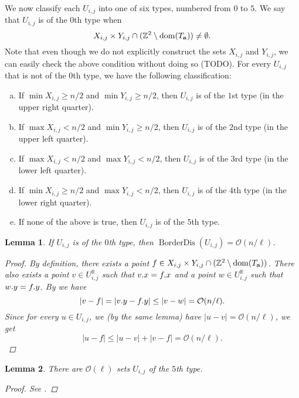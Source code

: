 \documentclass[11pt]{article}
\newcommand{\R}{\mathbb{R}}
\newcommand{\Z}{\mathbb{Z}}
\renewcommand{\O}{\mathcal{O}}
\theoremstyle{plain}
\newtheorem{lemma}{Lemma}
\theoremstyle{definition}
\theoremstyle{remark}
\DeclareMathOperator*{\BD}{BorderDis}
\begin{document}
We now classify each $U_{i, j}$ into one of six types, numbered from $0$ to $5$.
We say that $U_{i, j}$ is of the $0$th type when
$$ X_{i, j} \times Y_{i, j} \cap (\Z^2 \setminus \d{\Ta}) \neq \emptyset.$$
Note that even though we do not explicitly construct the sets $X_{i, j}$ and $Y_{i, j}$, we can easily check the above condition without doing so (TODO).
For every $U_{i, j}$ that is not of the $0$th type, we have the following classification:
\begin{enumerate}[a)]
	\item If $\min X_{i, j} \ge n / 2$ and $\min Y_{i, j} \ge n / 2$, then $U_{i, j}$ is of the $1$st type (in the upper right quarter).
	\item If $\max X_{i, j}  <  n / 2$ and $\min Y_{i, j} \ge n / 2$, then $U_{i, j}$ is of the $2$nd type (in the upper left quarter).
	\item If $\max X_{i, j}  <  n / 2$ and $\max Y_{i, j}  <  n / 2$, then $U_{i, j}$ is of the $3$rd type (in the lower left quarter).
	\item If $\min X_{i, j} \ge n / 2$ and $\max Y_{i, j}  <  n / 2$, then $U_{i, j}$ is of the $4$th type (in the lower right quarter).
	\item If none of the above is true, then $U_{i, j}$ is of the $5$th type.
\end{enumerate}

\begin{lemma}\label{border_distance_bound}
	If $U_{i, j}$ is of the $0$th type, then $\BD(U_{i, j}) = \O(n / \ell)$.
	\begin{proof}
		By definition, there exists a point $f \in X_{i, j} \times Y_{i, j} \cap (\Z^2 \setminus \d{\Ta})$.
		There also exists a point $v \in U^\R_{i, j}$ such that $v.x = f.x$ and a point $w \in U^\R_{i, j}$ such that $w.y = f.y$.
		By  we have
		$$ |v - f| = |\y{v} - \y{f}| \le |v - w| = \O(n / \ell).$$
		Since for every $u \in U_{i, j}$, we (by the same lemma) have $|u - v| = \O(n / \ell)$, we get
		$$ |u - f| \le |u - v| + |v - f| = \O(n / \ell).$$
	\end{proof}
\end{lemma}


\begin{lemma}\label{type 5 bound}
	There are $\O(\ell)$ sets $U_{i, j}$ of the $5$th type.
	\begin{proof} See . \end{proof}
\end{lemma}
\end{document}
